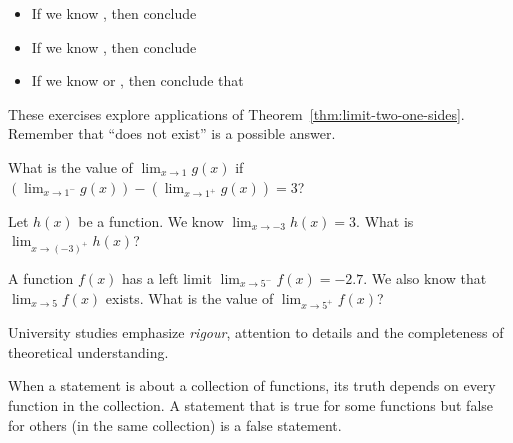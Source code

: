 \documentclass[../main.tex]{subfiles}
\begin{document}
\begin{itemize}[wide]
  \item If we know , then conclude



  \item If we know , then conclude


  \item If we know  or , then conclude that

\end{itemize}

\bigskip
These exercises explore applications of Theorem~\ref{thm:limit-two-one-sides}. Remember that \enquote{does not exist} is a possible answer.

\begin{exercise}
  What is the value of \(\lim_{x \to 1} g(x)\) if \(\left( \lim_{x \to 1^{-}} g(x)\right) - \left(\lim_{x \to 1^{+}} g(x) \right) = 3\)?

  \blanks*
\end{exercise}

\begin{exercise}
  Let \(h(x)\) be a function. We know \(\lim_{x \to -3} h(x) = 3\). What is \(\lim_{x \to (-3)^{+}} h(x)\)?

  \blanks*
\end{exercise}

\begin{exercise}
  A function \(f(x)\) has a left limit \(\lim_{x \to 5^{-}} f(x) = -2.7\).  We also know that \(\lim_{x \to 5}f(x)\) exists. What is the value of \(\lim_{x \to 5^{+}} f(x)\)?

  \blanks*
\end{exercise}
\clearpage

University studies emphasize \emph{rigour}, attention to details and the completeness of theoretical understanding.

\faStar{} When a statement is about a collection of functions, its truth depends on every function in the collection. A statement that is true for some functions but false for others (in the same collection) is a false statement.
\end{document}
